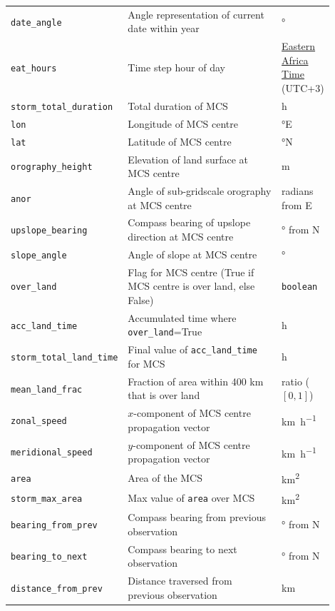 {\begin{longtable}{>{\raggedright\arraybackslash}p{0.25\linewidth} p{0.50\linewidth} >{\raggedright\arraybackslash}p{0.15\linewidth}}
    \texttt{date\_angle} & Angle representation of current date within year & \unit{\degree} \\
    \texttt{eat\_hours} & Time step hour of day & \href{https://www.timeanddate.com/time/zones/eat}{Eastern Africa Time} (UTC+3) \\
    \texttt{storm\_total\_duration} & Total duration of MCS & \unit{\hour} \\
    \texttt{lon} & Longitude of MCS centre & \unit{\degree}E \\
    \texttt{lat} & Latitude of MCS centre & \unit{\degree}N \\
    \texttt{orography\_height} & Elevation of land surface at MCS centre & \unit{\meter} \\
    \texttt{anor} & Angle of sub-gridscale orography at MCS centre & radians from E \\
    \texttt{upslope\_bearing} & Compass bearing of upslope direction at MCS centre & \unit{\degree} from  N \\
    \texttt{slope\_angle} & Angle of slope at MCS centre & \unit{\degree} \\
    \texttt{over\_land} & Flag for MCS centre (True if MCS centre is over land, else False) & \texttt{boolean} \\
    \texttt{acc\_land\_time} & Accumulated time where \texttt{over\_land}=True & \unit{\hour} \\
    \texttt{storm\_total\_land\_time} & Final value of \texttt{acc\_land\_time} for MCS & \unit{\hour} \\
    \texttt{mean\_land\_frac} & Fraction of area within 400 km that is over land & ratio ($[0,1]$) \\
    \texttt{zonal\_speed} & $x$-component of MCS centre propagation vector & \unit{\km\per\hour} \\
    \texttt{meridional\_speed} & $y$-component of MCS centre propagation vector & \unit{\km\per\hour} \\
    \texttt{area} & Area of the MCS & \unit{\km\squared} \\
    \texttt{storm\_max\_area} & Max value of \texttt{area} over MCS & \unit{\km\squared} \\
    \texttt{bearing\_from\_prev} & Compass bearing from previous observation & \unit{\degree} from  N \\
    \texttt{bearing\_to\_next} & Compass bearing to next observation & \unit{\degree} from  N \\
    \texttt{distance\_from\_prev} & Distance traversed from previous observation & \unit{\km} \\

\end{longtable}}
